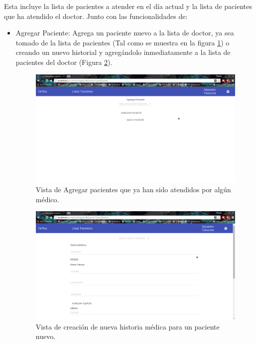 \begin{enumerate}
\begin{itemize}
            Esta incluye la lista de pacientes a atender en el día actual y la lista de pacientes que ha atendido el doctor. Junto con las funcionalidades de:
            
            \begin{itemize}
                \item Agregar Paciente: Agrega un paciente nuevo a la lista de doctor, ya sea tomado de la lista de pacientes (Tal como se muestra en la figura \ref{Agregar}) o creando un nuevo historial y agregándolo inmediatamente a la lista de pacientes del doctor (Figura \ref{creación}).
                
                \begin{figure}[htbp!]
                    \begin{center}
                        \includegraphics[width=.8\textwidth]{figures/p8}
                    \end{center}
                    \caption{Vista de Agregar pacientes que ya han sido atendidos por algún médico.}
                    \label{Agregar}
                \end{figure}
                
                \begin{figure}[htbp!]
                    \begin{center}
                        \includegraphics[width=.8\textwidth]{figures/p10}
                    \end{center}
                    \caption{Vista de creación de nueva historia médica para un paciente nuevo.}
                    \label{creación}
                \end{figure}
                

\end{itemize}
\end{itemize}
\end{enumerate}
